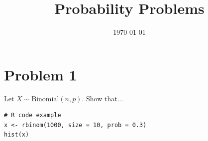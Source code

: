 \documentclass{article}
\title{Probability Problems}
\author{}
\date{\today}
\begin{document}
\maketitle

\section*{Problem 1}
Let $X \sim \text{Binomial}(n, p)$. Show that...

\begin{lstlisting}
# R code example
x <- rbinom(1000, size = 10, prob = 0.3)
hist(x)
\end{lstlisting}
\end{document}
